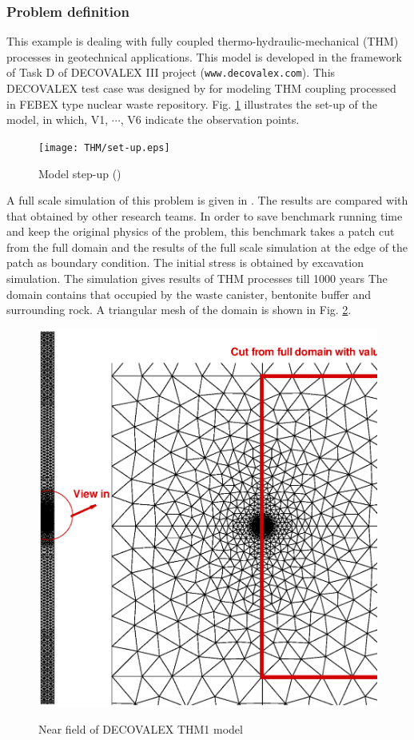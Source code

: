 \subsubsection*{Problem definition}
This example is dealing with fully coupled
thermo-hydraulic-mechanical (THM) processes in geotechnical
applications. This model is developed in the framework of Task D of
DECOVALEX III project (\texttt{www.decovalex.com}). This DECOVALEX test
case was designed by \cite{LBNL} for modeling THM coupling processed in FEBEX type nuclear waste repository.
Fig. \ref{fig_mod} illustrates the set-up of the model, in which, V1, $\cdots$, V6 indicate the observation points.
\begin{figure}[H]
  \centering
  \texttt{[image: THM/set-up.eps]}
  \caption{Model step-up (\cite{LBNL})}
  \label{fig_mod}
\end{figure}
A full scale simulation of this problem is given in \cite{WXNKHK:05}. The results are compared with that obtained
 by other research teams\cite{RBCKLOWZ:06}.  In order to save benchmark running time and keep the original physics of the problem,
     this benchmark takes a patch cut from the full domain and the results of
  the full scale simulation at the edge of the patch as boundary condition. The initial stress is obtained
     by excavation simulation. The simulation gives results of THM processes till 1000 years
    The domain contains that occupied by the waste canister, bentonite \mbox{buf\mbox{}fer} and surrounding rock. A triangular
      mesh of the domain is shown in Fig. \ref{fig:THMMesh}.
  \begin{figure}[!htb]
  \centering
   \includegraphics[scale=0.3]{THM/thm1_cut.eps}\\
  \caption{Near field of DECOVALEX THM1 model }
  \label{fig:THMMesh}
\end{figure}

